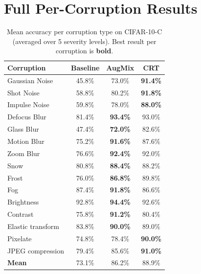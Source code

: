 \documentclass[10pt,twocolumn]{article}
\begin{document}
\section{Full Per-Corruption Results}
\label{app:full_results}

\begin{table}[h]
\centering
\small
\caption{Mean accuracy per corruption type on CIFAR-10-C (averaged over 5 severity levels). Best result per corruption is \textbf{bold}.}
\label{tab:full_corruption}
\begin{tabular}{lccc}
\toprule
\textbf{Corruption} & \textbf{Baseline} & \textbf{AugMix} & \textbf{CRT} \\
\midrule
Gaussian Noise  & 45.8\% & 73.0\% & \textbf{91.4\%} \\
Shot Noise      & 58.8\% & 80.2\% & \textbf{91.8\%} \\
Impulse Noise   & 59.8\% & 78.0\% & \textbf{88.0\%} \\
Defocus Blur    & 81.4\% & \textbf{93.4\%} & 93.0\% \\
Glass Blur      & 47.4\% & \textbf{72.0\%} & 82.6\% \\
Motion Blur     & 75.2\% & \textbf{91.6\%} & 87.6\% \\
Zoom Blur       & 76.6\% & \textbf{92.4\%} & 92.0\% \\
Snow            & 80.8\% & \textbf{88.4\%} & 88.2\% \\
Frost           & 76.0\% & \textbf{86.8\%} & 89.8\% \\
Fog             & 87.4\% & \textbf{91.8\%} & 86.6\% \\
Brightness      & 92.8\% & \textbf{94.4\%} & 92.6\% \\
Contrast        & 75.8\% & \textbf{91.2\%} & 80.4\% \\
Elastic transform        & 83.8\% & \textbf{90.0\%} & 89.0\% \\
Pixelate        & 74.8\% & 78.4\% & \textbf{90.0\%} \\
JPEG compression           & 79.4\% & 85.6\% & \textbf{91.0\%} \\
\midrule
\textbf{Mean}   & 73.1\% & 86.2\% & 88.9\% \\
\bottomrule
\end{tabular}
\end{table}
\end{document}
